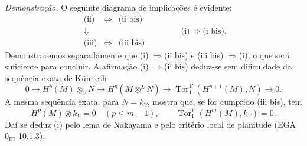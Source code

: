 \emph{Demonstração.} O seguinte diagrama de implicações é evidente:
\[
\begin{array}{ccc}
\text{(ii)}&\Leftrightarrow&\text{(ii bis)}\\
\Downarrow&&\\
\text{(iii)}&\Leftrightarrow&\text{(iii bis)}
\end{array}
\qquad\qquad
\text{(i)}\Rightarrow\text{(i bis).}
\]
Demonstraremos separadamente que (i) $\Rightarrow$(ii bis) e (iii bis) $\Rightarrow$(i), o que será suficiente para concluir. A afirmação (i) $\Rightarrow$(ii bis) deduz-se sem dificuldade da sequência exata de Künneth
\[
0\to H^p(M)\otimes_V N\to H^p(M\otimes^L N)\to \operatorname{Tor}_1^V(H^{p+1}(M),N)\to0.
\]
A mesma sequência exata, para $N=k_V$, mostra que, se for cumprido (iii bis), tem
\[
H^p(M)\otimes k_V=0\quad(p\le m-1),\qquad
\operatorname{Tor}_1^V(H^m(M),k_V)=0.
\]
Daí se deduz (i) pelo lema de Nakayama e pelo critério local de planitude (EGA $0_{\mathrm{III}}$ 10.1.3).
